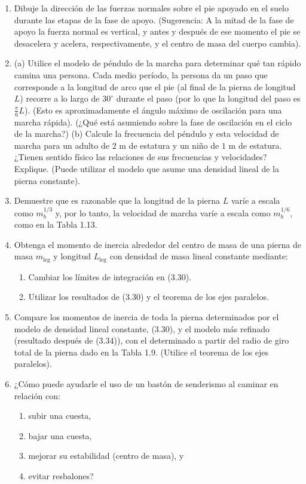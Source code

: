 \documentclass[12pt]{book}
\begin{document}
\begin{enumerate}
\item[3.23] Dibuje la dirección de las fuerzas normales sobre el pie apoyado en el suelo durante las etapas de la fase de apoyo. (Sugerencia: A la mitad de la fase de apoyo la fuerza normal es vertical, y antes y después de ese momento el pie se desacelera y acelera, respectivamente, y el centro de masa del cuerpo cambia).

\item[3.24] (a) Utilice el modelo de péndulo de la marcha para determinar qué tan rápido camina una persona. Cada medio período, la persona da un paso que corresponde a la longitud de arco que el pie (al final de la pierna de longitud $L$) recorre a lo largo de $30^\circ$ durante el paso (por lo que la longitud del paso es $\frac{\pi}{6} L$). (Esto es aproximadamente el ángulo máximo de oscilación para una marcha rápida). (¿Qué está asumiendo sobre la fase de oscilación en el ciclo de la marcha?)
(b) Calcule la frecuencia del péndulo y esta velocidad de marcha para un adulto de $2\text{ m}$ de estatura y un niño de $1\text{ m}$ de estatura. ¿Tienen sentido físico las relaciones de sus frecuencias y velocidades? Explique. (Puede utilizar el modelo que asume una densidad lineal de la pierna constante).

\item[3.25] Demuestre que es razonable que la longitud de la pierna $L$ varíe a escala como $m_b^{1/3}$ y, por lo tanto, la velocidad de marcha varíe a escala como $m_b^{1/6}$, como en la Tabla 1.13.

\item[3.26] Obtenga el momento de inercia alrededor del centro de masa de una pierna de masa $m_{\text{leg}}$ y longitud $L_{\text{leg}}$ con densidad de masa lineal constante mediante:
\begin{enumerate}
\item[(a)] Cambiar los límites de integración en (3.30).
\item[(b)] Utilizar los resultados de (3.30) y el teorema de los ejes paralelos.
\end{enumerate}

\item[3.27] Compare los momentos de inercia de toda la pierna determinados por el modelo de densidad lineal constante, (3.30), y el modelo más refinado (resultado después de (3.34)), con el determinado a partir del radio de giro total de la pierna dado en la Tabla 1.9. (Utilice el teorema de los ejes paralelos).

\item[3.28] ¿Cómo puede ayudarle el uso de un bastón de senderismo al caminar en relación con:
\begin{enumerate}
\item[(a)] subir una cuesta,
\item[(b)] bajar una cuesta,
\item[(c)] mejorar su estabilidad (centro de masa), y
\item[(d)] evitar resbalones?
\end{enumerate}


\end{enumerate}
\end{document}
